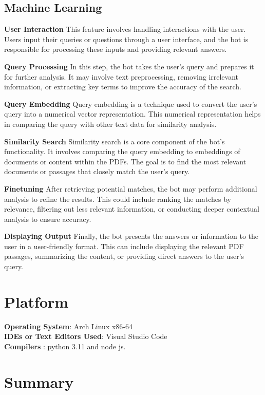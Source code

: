 \documentclass[11pt]{article}
\begin{document}
\subsection{Machine Learning}

\textbf{User Interaction} This feature involves handling interactions with the user. Users input their queries or questions through a user interface, and the bot is responsible for processing these inputs and providing relevant answers.

\textbf{Query Processing} In this step, the bot takes the user's query and prepares it for further analysis. It may involve text preprocessing, removing irrelevant information, or extracting key terms to improve the accuracy of the search.

\textbf{Query Embedding} Query embedding is a technique used to convert the user's query into a numerical vector representation. This numerical representation helps in comparing the query with other text data for similarity analysis.

\textbf{Similarity Search} Similarity search is a core component of the bot's functionality. It involves comparing the query embedding to embeddings of documents or content within the PDFs. The goal is to find the most relevant documents or passages that closely match the user's query.

\textbf{Finetuning} After retrieving potential matches, the bot may perform additional analysis to refine the results. This could include ranking the matches by relevance, filtering out less relevant information, or conducting deeper contextual analysis to ensure accuracy.

\textbf{Displaying Output} Finally, the bot presents the answers or information to the user in a user-friendly format. This can include displaying the relevant PDF passages, summarizing the content, or providing direct answers to the user's query.

\section{Platform}
\textbf{Operating System}: Arch Linux x86-64 \\
\textbf{IDEs or Text Editors Used}: Visual Studio Code\\
\textbf{Compilers} : python 3.11 and node js. \\

\section{Summary}
\end{document}
